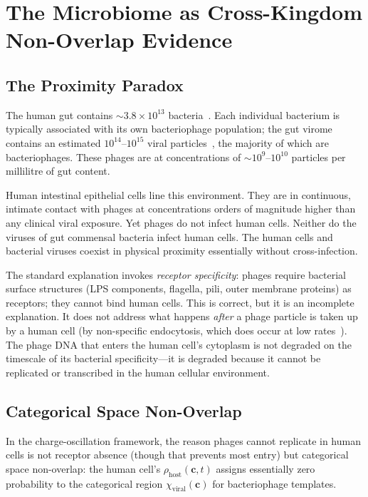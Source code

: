 \documentclass[11pt,twocolumn,a4paper]{article}
\theoremstyle{definition}
\theoremstyle{remark}
\newcommand{\Phost}{\rho_{\mathrm{host}}}
\newcommand{\chiviral}{\chi_{\mathrm{viral}}}
\newcommand{\vv}[1]{\boldsymbol{#1}}
\begin{document}
\section{The Microbiome as Cross-Kingdom Non-Overlap Evidence}
\label{sec:microbiome}

\subsection{The Proximity Paradox}

The human gut contains $\sim\!3.8 \times 10^{13}$ bacteria~\cite{Sender2016}. Each individual bacterium is typically associated with its own bacteriophage population; the gut virome contains an estimated $10^{14}$--$10^{15}$ viral particles~\cite{Reyes2010,Virgin2014,Minot2011}, the majority of which are bacteriophages. These phages are at concentrations of $\sim\!10^9$--$10^{10}$ particles per millilitre of gut content.

Human intestinal epithelial cells line this environment. They are in continuous, intimate contact with phages at concentrations orders of magnitude higher than any clinical viral exposure. Yet phages do not infect human cells. Neither do the viruses of gut commensal bacteria infect human cells. The human cells and bacterial viruses coexist in physical proximity essentially without cross-infection.

The standard explanation invokes \emph{receptor specificity}: phages require bacterial surface structures (LPS components, flagella, pili, outer membrane proteins) as receptors; they cannot bind human cells. This is correct, but it is an incomplete explanation. It does not address what happens \emph{after} a phage particle is taken up by a human cell (by non-specific endocytosis, which does occur at low rates~\cite{Nguyen2017,Barr2013}). The phage DNA that enters the human cell's cytoplasm is not degraded on the timescale of its bacterial specificity---it is degraded because it cannot be replicated or transcribed in the human cellular environment.

\subsection{Categorical Space Non-Overlap}

In the charge-oscillation framework, the reason phages cannot replicate in human cells is not receptor absence (though that prevents most entry) but categorical space non-overlap: the human cell's $\Phost(\vv{c}, t)$ assigns essentially zero probability to the categorical region $\chiviral(\vv{c})$ for bacteriophage templates.
\end{document}
